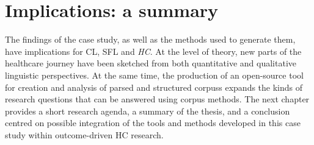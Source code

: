 

\section{Implications: a summary}

The findings of the case study, as well as the methods used to generate them, have implications for \gls{CL}, \gls{SFL} and \emph{HC}. At the level of theory, new parts of the healthcare journey have been sketched from both quantitative and qualitative linguistic perspectives. At the same time, the production of an open\hyp{}source tool for creation and analysis of parsed and structured \glspl{corpus} expands the kinds of research questions that can be answered using corpus methods. The next chapter provides a short research agenda, a summary of the thesis, and a conclusion centred on possible integration of the tools and methods developed in this case study within outcome\hyp{}driven \gls{HC} research.


